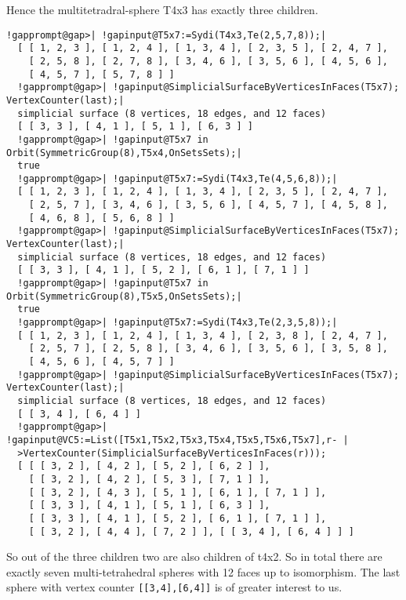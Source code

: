 \documentclass[a4paper,11pt]{report}
\begin{document}
{{{ Hence the multitetradral-sphere T4x3 has exactly three children. 

 
\begin{Verbatim}[commandchars=!@|,fontsize=\small,frame=single,label=Example]
  !gapprompt@gap>| !gapinput@T5x7:=Sydi(T4x3,Te(2,5,7,8));|
  [ [ 1, 2, 3 ], [ 1, 2, 4 ], [ 1, 3, 4 ], [ 2, 3, 5 ], [ 2, 4, 7 ], 
    [ 2, 5, 8 ], [ 2, 7, 8 ], [ 3, 4, 6 ], [ 3, 5, 6 ], [ 4, 5, 6 ], 
    [ 4, 5, 7 ], [ 5, 7, 8 ] ]
  !gapprompt@gap>| !gapinput@SimplicialSurfaceByVerticesInFaces(T5x7); VertexCounter(last);|
  simplicial surface (8 vertices, 18 edges, and 12 faces)
  [ [ 3, 3 ], [ 4, 1 ], [ 5, 1 ], [ 6, 3 ] ]
  !gapprompt@gap>| !gapinput@T5x7 in Orbit(SymmetricGroup(8),T5x4,OnSetsSets);|
  true
  !gapprompt@gap>| !gapinput@T5x7:=Sydi(T4x3,Te(4,5,6,8));|
  [ [ 1, 2, 3 ], [ 1, 2, 4 ], [ 1, 3, 4 ], [ 2, 3, 5 ], [ 2, 4, 7 ], 
    [ 2, 5, 7 ], [ 3, 4, 6 ], [ 3, 5, 6 ], [ 4, 5, 7 ], [ 4, 5, 8 ], 
    [ 4, 6, 8 ], [ 5, 6, 8 ] ]
  !gapprompt@gap>| !gapinput@SimplicialSurfaceByVerticesInFaces(T5x7); VertexCounter(last);|
  simplicial surface (8 vertices, 18 edges, and 12 faces)
  [ [ 3, 3 ], [ 4, 1 ], [ 5, 2 ], [ 6, 1 ], [ 7, 1 ] ]
  !gapprompt@gap>| !gapinput@T5x7 in Orbit(SymmetricGroup(8),T5x5,OnSetsSets);|
  true
  !gapprompt@gap>| !gapinput@T5x7:=Sydi(T4x3,Te(2,3,5,8));|
  [ [ 1, 2, 3 ], [ 1, 2, 4 ], [ 1, 3, 4 ], [ 2, 3, 8 ], [ 2, 4, 7 ], 
    [ 2, 5, 7 ], [ 2, 5, 8 ], [ 3, 4, 6 ], [ 3, 5, 6 ], [ 3, 5, 8 ], 
    [ 4, 5, 6 ], [ 4, 5, 7 ] ]
  !gapprompt@gap>| !gapinput@SimplicialSurfaceByVerticesInFaces(T5x7); VertexCounter(last);|
  simplicial surface (8 vertices, 18 edges, and 12 faces)
  [ [ 3, 4 ], [ 6, 4 ] ]
  !gapprompt@gap>| !gapinput@VC5:=List([T5x1,T5x2,T5x3,T5x4,T5x5,T5x6,T5x7],r- |
  >VertexCounter(SimplicialSurfaceByVerticesInFaces(r)));
  [ [ [ 3, 2 ], [ 4, 2 ], [ 5, 2 ], [ 6, 2 ] ], 
    [ [ 3, 2 ], [ 4, 2 ], [ 5, 3 ], [ 7, 1 ] ], 
    [ [ 3, 2 ], [ 4, 3 ], [ 5, 1 ], [ 6, 1 ], [ 7, 1 ] ], 
    [ [ 3, 3 ], [ 4, 1 ], [ 5, 1 ], [ 6, 3 ] ], 
    [ [ 3, 3 ], [ 4, 1 ], [ 5, 2 ], [ 6, 1 ], [ 7, 1 ] ], 
    [ [ 3, 2 ], [ 4, 4 ], [ 7, 2 ] ], [ [ 3, 4 ], [ 6, 4 ] ] ]
\end{Verbatim}
 

 So out of the three children two are also children of t4x2. So in total there
are exactly seven multi-tetrahedral spheres with 12 faces up to isomorphism.
The last sphere with vertex counter \texttt{[[3,4],[6,4]]} is of greater interest to us. 

 
\begin{center}

\end{center}
 
}}}
\end{document}
